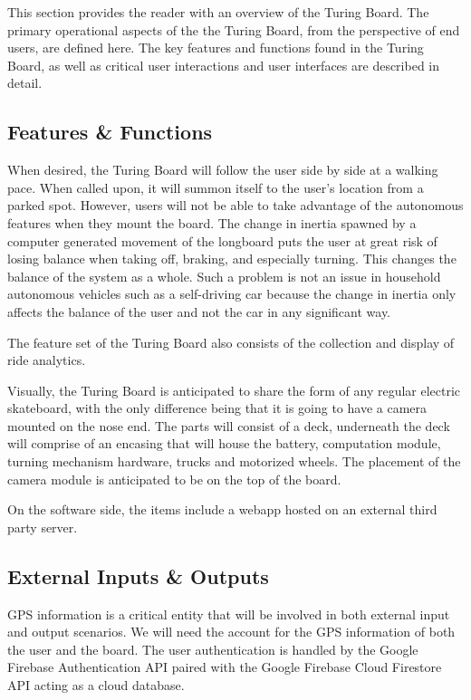 This section provides the reader with an overview of the Turing Board. The primary operational aspects of the the Turing Board, from the perspective of end users, are defined here. The key features and functions found in the Turing Board, as well as critical user interactions and user interfaces are described in detail.

\subsection{Features \& Functions}
When desired, the Turing Board will follow the user side by side at a walking pace. When called upon, it will summon itself to the user's location from a parked spot. However, users will not be able to take advantage of the autonomous features when they mount the board. The change in inertia spawned by a computer generated movement of the longboard puts the user at great risk of losing balance when taking off, braking, and especially turning. This changes the balance of the system as a whole. Such a problem is not an issue in household autonomous vehicles such as a self-driving car because the change in inertia only affects the balance of the user and not the car in any significant way. 

The feature set of the Turing Board also consists of the collection and display of ride analytics.

Visually, the Turing Board is anticipated to share the form of any regular electric skateboard, with the only difference being that it is going to have a camera mounted on the nose end. The parts will consist of a deck, underneath the deck will comprise of an encasing that will house the battery, computation module, turning mechanism hardware, trucks and motorized wheels. The placement of the camera module is anticipated to be on the top of the board. 

On the software side, the items include a webapp hosted on an external third party server. 

\subsection{External Inputs \& Outputs}
GPS information is a critical entity that will be involved in both external input and output scenarios. We will need the account for the GPS information of both the user and the board. The user authentication is handled by the Google Firebase Authentication API paired with the Google Firebase Cloud Firestore API acting as a cloud database. 

